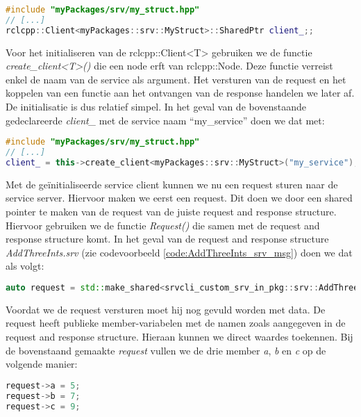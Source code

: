 \begin{lstlisting}[language=C++, caption={Een voorbeeld van het declareren van een service client.}, firstnumber=0, label={}]
#include "myPackages/srv/my_struct.hpp"
// [...]
rclcpp::Client<myPackages::srv::MyStruct>::SharedPtr client_;;
\end{lstlisting}

Voor het initialiseren van de rclcpp::Client<T> gebruiken we de functie \textit{create\_client<T>()} die een node erft van rclcpp::Node. Deze functie verreist enkel de naam van de service als argument. Het versturen van de request en het koppelen van een functie aan het ontvangen van de response handelen we later af. De initialisatie is dus relatief simpel. In het geval van de bovenstaande gedeclareerde \textit{client\_} met de service naam ``my\_service'' doen we dat met:

\begin{lstlisting}[language=C++, caption={Het initialiseren van een service client. Meestal gebeurt dit in de constructor.}, firstnumber=0, label={}]
#include "myPackages/srv/my_struct.hpp"
// [...]
client_ = this->create_client<myPackages::srv::MyStruct>("my_service");;
\end{lstlisting}

Met de geïnitialiseerde service client kunnen we nu een request sturen naar de service server. Hiervoor maken we eerst een request. Dit doen we door een shared pointer te maken van de request van de juiste request and response structure. Hiervoor gebruiken we de functie \textit{Request()} die samen met de request and response structure komt. In het geval van de request and response structure \textit{AddThreeInts.srv} (zie codevoorbeeld \ref{code:AddThreeInts_srv_msg}) doen we dat als volgt:

\begin{lstlisting}[language=C++, caption={}, firstnumber=0, label={}]
auto request = std::make_shared<srvcli_custom_srv_in_pkg::srv::AddThreeInts::Request>();
\end{lstlisting}

Voordat we de request versturen moet hij nog gevuld worden met data. De request heeft publieke member-variabelen met de namen zoals aangegeven in de request and response structure. Hieraan kunnen we direct waardes toekennen. Bij de bovenstaand gemaakte \textit{request} vullen we de drie member \textit{a}, \textit{b} en \textit{c} op de volgende manier:

\begin{lstlisting}[language=C++, caption={}, firstnumber=0, label={}]
request->a = 5;
request->b = 7;
request->c = 9;
\end{lstlisting}

